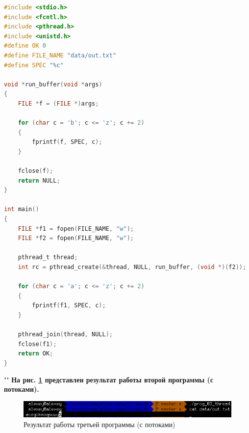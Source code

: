 \documentclass[12pt]{report}
\begin{document}
\begin{lstlisting}[language=c, label=p3thread, caption=Программа №3 (реализация с потоками)]
#include <stdio.h>
#include <fcntl.h>
#include <pthread.h>
#include <unistd.h>
#define OK 0
#define FILE_NAME "data/out.txt"
#define SPEC "%c"

void *run_buffer(void *args)
{
	FILE *f = (FILE *)args;
	
	for (char c = 'b'; c <= 'z'; c += 2)
	{
		fprintf(f, SPEC, c);
	}
	
	fclose(f);
	return NULL;
}

int main()
{
	FILE *f1 = fopen(FILE_NAME, "w");
	FILE *f2 = fopen(FILE_NAME, "w");
	
	pthread_t thread;
	int rc = pthread_create(&thread, NULL, run_buffer, (void *)(f2));
	
	for (char c = 'a'; c <= 'z'; c += 2)
	{
		fprintf(f1, SPEC, c);
	}
	
	pthread_join(thread, NULL);
	fclose(f1);
	return OK;
}
\end{lstlisting}

""\newline
\textbf{На рис. \ref{fig:prog_03_thread} представлен результат работы второй программы (с потоками).}

\begin{figure}[H]
	\centering
	\includegraphics[scale=0.8]{img/prog_03_thread.png}
	\caption{Результат работы третьей программы (с потоками)}
	\label{fig:prog_03_thread}
\end{figure}

	
\end{document}
